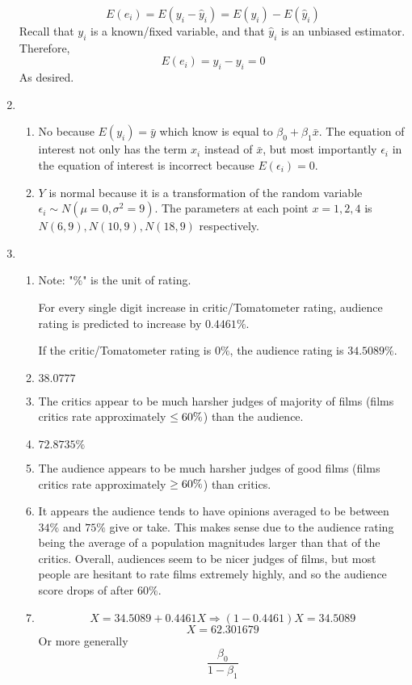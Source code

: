 \documentclass{article}
\begin{document}
\begin{enumerate}
    $$E(e_i)=E(y_i-\hat y_i)=E(y_i)-E(\hat y_i)$$
    Recall that $y_i$ is a known/fixed variable, and that $\hat y_i$ is an unbiased estimator.
    Therefore,
    $$E(e_i)=y_i-y_i=0$$
    As desired.
    
    \item
    \begin{enumerate}
        \item 
        
        No because $E(y_i)=\bar y$ which know is equal to $\beta_0+\beta_1\bar x$. The equation of interest not only has the term $x_i$ instead of $\bar x$, but most importantly $\epsilon_i$ in the equation of interest is incorrect because $E(\epsilon_i)=0$.
        
        \item
        $Y$ is normal because it is a transformation of the random variable $\epsilon_i\sim N(\mu=0,\sigma^2=9)$. The parameters at each point $x=1,2,4$ is $N(6,9),N(10,9),N(18,9)$ respectively.
    \end{enumerate}
    
    \item
    \begin{enumerate}
        \item 
        Note: "$\%$" is the unit of rating.
        
        For every single digit increase in critic/Tomatometer rating, audience rating is predicted to increase by $0.4461\%$.

        If the critic/Tomatometer rating is $0\%$, the audience rating is $34.5089\%$.
        \item
        $38.0777$
        \item
        The critics appear to be much harsher judges of majority of films (films critics rate approximately $\le60\textnormal{\%}$) than the audience.
        \item
        $72.8735\%$
        \item
        The audience appears to be much harsher judges of good films (films critics rate approximately $\ge60\textnormal{\%}$) than critics.
        \item
        It appears the audience tends to have opinions averaged to be between $34\%$ and $75\%$ give or take. This makes sense due to the audience rating being the average of a population magnitudes larger than that of the critics. Overall, audiences seem to be nicer judges of films, but most people are hesitant to rate films extremely highly, and so the audience score drops of after $60\%$.
        \item
        $$X=34.5089+0.4461X\Rightarrow(1-0.4461)X=34.5089$$
        $$X=62.301679$$
        Or more generally 
        $$\frac{\beta_0}{1-\beta_1}$$
    \end{enumerate}
    
\end{enumerate}
\end{document}
